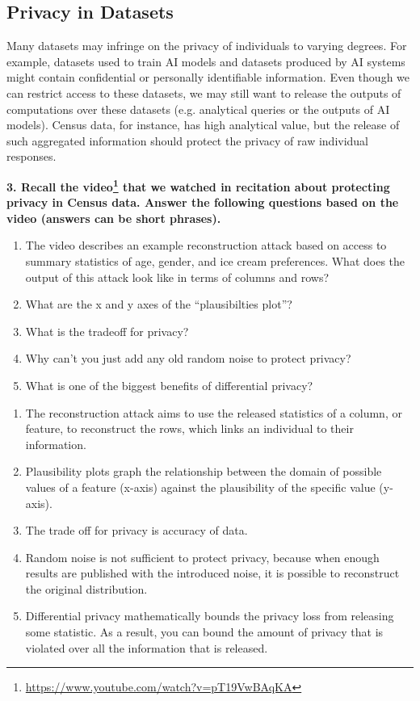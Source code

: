 \documentclass{article}
\begin{document}
\subsection*{Privacy in Datasets}

Many datasets may infringe on the privacy of individuals to varying degrees. For example, datasets used to train AI models and datasets produced by AI systems might contain confidential or personally identifiable information. Even though we can restrict access to these datasets, we may still want to release the outputs of computations over these datasets (e.g. analytical queries or the outputs of AI models). Census data, for instance, has high analytical value, but the release of such aggregated information should protect the privacy of raw individual responses. 

\textbf{3. Recall the video\footnote{\url{https://www.youtube.com/watch?v=pT19VwBAqKA}} that we watched in recitation about protecting privacy in Census data. Answer the following questions based on the video (answers can be short phrases).}
\begin{enumerate}[label=\Alph*.]
\item The video describes an example reconstruction attack based on access to summary statistics of age, gender, and ice cream preferences. What does the output of this attack look like in terms of columns and rows? 
\item What are the x and y axes of the ``plausibilties plot''?
\item What is the tradeoff for privacy?
\item Why can't you just add any old random noise to protect privacy?
\item What is one of the biggest benefits of differential privacy?
\end{enumerate}


\bigskip
\begin{mdframed}
\begin{enumerate}[label=\Alph*.]
\item The reconstruction attack aims to use the released statistics of a column, or feature, to reconstruct the rows, which links an individual to their information.  
\item Plausibility plots graph the relationship between the domain of possible values of a feature (x-axis) against the plausibility of the specific value (y-axis).
\item The trade off for privacy is accuracy of data.
\item Random noise is not sufficient to protect privacy, because when enough results are published with the introduced noise, it is possible to reconstruct the original distribution. 
\item Differential privacy mathematically bounds the privacy loss from releasing some statistic. As a result, you can bound the amount of privacy that is violated over all the information that is released. 
\end{enumerate}
\end{mdframed}
\bigskip
\end{document}
